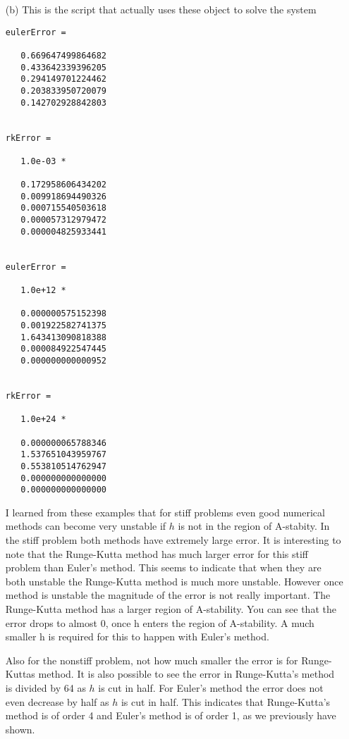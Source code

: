 \documentclass[11pt]{article}
\begin{document}
\begin{enumerate}
\begin{enumerate}
            \item[(b)]
                This is the script that actually uses these object to solve the system
                
                \begin{verbatim}
eulerError =

   0.669647499864682
   0.433642339396205
   0.294149701224462
   0.203833950720079
   0.142702928842803


rkError =

   1.0e-03 *

   0.172958606434202
   0.009918694490326
   0.000715540503618
   0.000057312979472
   0.000004825933441


eulerError =

   1.0e+12 *

   0.000000575152398
   0.001922582741375
   1.643413090818388
   0.000084922547445
   0.000000000000952


rkError =

   1.0e+24 *

   0.000000065788346
   1.537651043959767
   0.553810514762947
   0.000000000000000
   0.000000000000000
                \end{verbatim}

                I learned from these examples that for stiff problems
                even good numerical methods can become very unstable
                if $h$ is not in the region of A-stabity.
                In the stiff problem both methods have extremely large error.
                It is interesting to note that the Runge-Kutta method
                has much larger error for this stiff problem than
                Euler's method.
                This seems to indicate that when they are both
                unstable the Runge-Kutta method is much more unstable.
                However once method is unstable the magnitude of the
                error is not really important.
                The Runge-Kutta method has a larger region of A-stability.
                You can see that the error drops to almost 0, once
                h enters the region of A-stability.
                A much smaller h is required for this to happen
                with Euler's method.

                Also for the nonstiff problem, not how much smaller the
                error is for Runge-Kuttas method.
                It is also possible to see the error in Runge-Kutta's
                method is divided by 64 as $h$ is cut in
                half.
                For Euler's method the error does not even decrease
                by half as $h$ is cut in half.
                This indicates that Runge-Kutta's method is of order 4
                and Euler's method is of order 1, as we previously have
                shown.
        \end{enumerate}
\end{enumerate}
\end{document}
